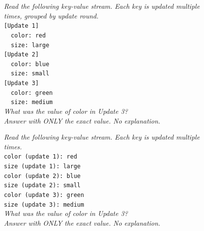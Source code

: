 \documentclass[11pt]{article}
\begin{document}
\begin{figure}[h]
\begin{minipage}[t]{0.48\textwidth}
\begin{tcolorbox}[
    colframe=black!30, colback=gray!4,
    boxrule=0.5pt, arc=2pt,
    left=6pt, right=6pt, top=4pt, bottom=4pt,
    equal height group=fmts,
    title={\textbf{Block} (\texttt{block})},
    fonttitle=\small\bfseries,
    coltitle=black]
\emph{Read the following key-value stream. Each key is updated
multiple times, grouped by update round.}\\[4pt]
\texttt{[Update 1]}\\
\texttt{\ \ color: red}\\
\texttt{\ \ size: large}\\
\texttt{[Update 2]}\\
\texttt{\ \ color: blue}\\
\texttt{\ \ size: small}\\
\texttt{[Update 3]}\\
\texttt{\ \ color: green}\\
\texttt{\ \ size: medium}\\[4pt]
\emph{What was the value of color in Update 3?}\\
\emph{Answer with ONLY the exact value. No explanation.}
\end{tcolorbox}
\end{minipage}\hfill
\begin{minipage}[t]{0.48\textwidth}
\begin{tcolorbox}[
    colframe=black!30, colback=gray!4,
    boxrule=0.5pt, arc=2pt,
    left=6pt, right=6pt, top=4pt, bottom=4pt,
    equal height group=fmts,
    title={\textbf{Labeled} (\texttt{flat\_verbose})},
    fonttitle=\small\bfseries,
    coltitle=black]
\emph{Read the following key-value stream. Each key is updated
multiple times.}\\[4pt]
\texttt{color (update 1): red}\\
\texttt{size (update 1): large}\\
\texttt{color (update 2): blue}\\
\texttt{size (update 2): small}\\
\texttt{color (update 3): green}\\
\texttt{size (update 3): medium}\\[4pt]
\emph{What was the value of color in Update 3?}\\
\emph{Answer with ONLY the exact value. No explanation.}
\end{tcolorbox}


\end{minipage}
\end{figure}
\end{document}
